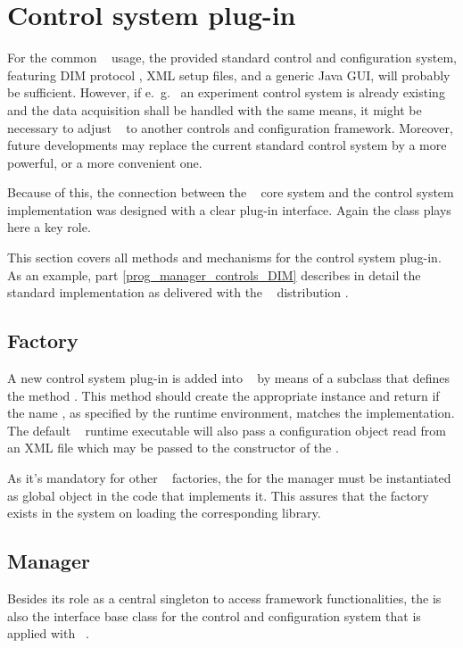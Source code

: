 \section{Control system plug-in}
\label{prog_manager_controls}
For the common \dabc~ usage, the provided standard control and configuration system,
featuring DIM protocol \cite{DIM}, XML setup files, and a generic Java GUI,
will probably be sufficient.
However, if e.~g.~
an experiment control system is already existing and the data acquisition
shall be handled with the same means,
it might be necessary to adjust \dabc~ to another
controls and configuration framework.
Moreover, future developments may replace the current standard control
system by a more powerful, or a more convenient one.

Because of this, the connection between the \dabc~ core system and the
control system implementation was designed with a clear plug-in interface.
Again the  class plays here a key role.

This section covers all methods and mechanisms for
the control system plug-in. As an example, part \ref{prog_manager_controls_DIM}  
describes in detail the standard implementation as delivered with the \dabc~ distribution .



\subsection{Factory}
 \label{prog_manager_controls_factory}
A new control system plug-in is added into \dabc~ 
by means of a  subclass that  
defines the method
.
This method should
create the appropriate  instance and return  
if the name , as specified by the runtime environment,
matches the implementation.
The default \dabc~ runtime executable will also pass 
a configuration object  read from an XML file which may be
passed to the constructor of the .

As it's mandatory for other \dabc~ factories, 
the  for the manager must be
instantiated as global object in the code that implements it.
This assures that the factory exists in the system on
loading the corresponding library.

\subsection{Manager}
\label{prog_manager_controls_manager}
Besides its role as a central singleton to access framework functionalities,
the  is also the interface base class for the 
control and configuration system that is applied with \dabc~. 

